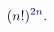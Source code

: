 \documentclass[12pt]{article}
\begin{document}
\makeatletter
\renewcommand*{\@textcolor}[3]{%
  \protect\leavevmode
  \begingroup
    \color#1{#2}#3%
  \endgroup
}
\makeatother
\begin{displaymath}
\mathcolor[RGB]{0,0,15}{(} \mathcolor[RGB]{0,0,30}{n} \mathcolor[RGB]{0,0,45}{!} \mathcolor[RGB]{0,0,60}{)} ^ { \mathcolor[RGB]{0,0,75}{2} \mathcolor[RGB]{0,0,90}{n} } \mathcolor[RGB]{0,0,105}{.}
\end{displaymath}
\end{document}
